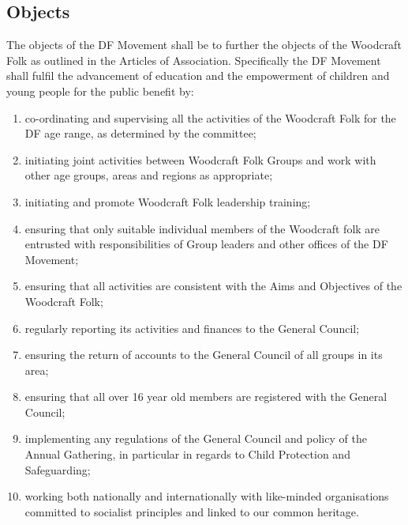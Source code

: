 \documentclass[a4paper, 12pt]{report}
\begin{document}
\subsection{Objects}
\label{sec:objects}
The objects of the DF Movement shall be to further the objects of the Woodcraft Folk as outlined in the Articles of Association. Specifically the DF Movement shall fulfil the advancement of education and the empowerment of children and young people for the public benefit by:
\begin{enumerate}
\item co-ordinating and supervising all the activities of the Woodcraft Folk for the DF age range, as determined by the committee;
\item initiating joint activities between Woodcraft Folk Groups and work with other age groups, areas and regions as appropriate;
\item initiating and promote Woodcraft Folk leadership training;
\item ensuring that only suitable individual members of the Woodcraft folk are entrusted with responsibilities of Group leaders and other offices of the DF Movement;
\item ensuring that all activities are consistent with the Aims and Objectives of the Woodcraft Folk;
\item regularly reporting its activities and finances to the General Council;
\item ensuring the return of accounts to the General Council of all groups in its area;
\item ensuring that all over 16 year old members are registered with the General Council;
\item implementing any regulations of the General Council and policy of the Annual Gathering, in particular in regards to Child Protection and Safeguarding;
\item working both nationally and internationally with like-minded organisations committed
to socialist principles and linked to our common heritage.
\end{enumerate}
\end{document}

